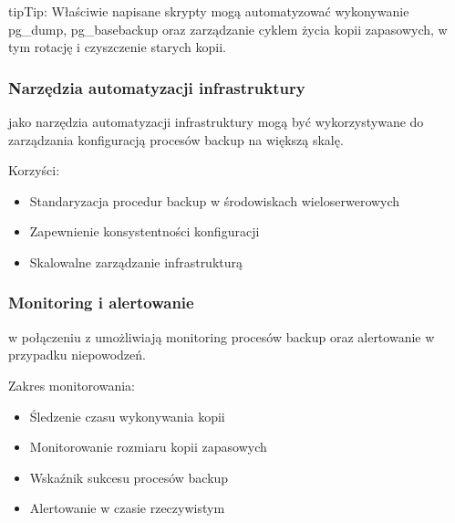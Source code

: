 \documentclass[a4paper,11pt,openany,english]{sphinxmanual}
\begin{document}
\begin{sphinxadmonition}{tip}{Tip:}
\sphinxAtStartPar
Właściwie napisane skrypty mogą automatyzować wykonywanie pg\_dump, pg\_basebackup oraz zarządzanie cyklem życia kopii zapasowych, w tym rotację i czyszczenie starych kopii.
\end{sphinxadmonition}


\subsubsection{Narzędzia automatyzacji infrastruktury}
\label{\detokenize{rozdzial2/Kopie_zapasowe_i_odzyskiwanie_danych/kopie_zapasowe_i_odzyskiwanie_danych:narzedzia-automatyzacji-infrastruktury}}
\sphinxAtStartPar
{} jako narzędzia automatyzacji infrastruktury mogą być wykorzystywane do zarządzania konfiguracją procesów backup na większą skalę.

\sphinxAtStartPar
Korzyści:
\begin{itemize}
\item {} 
\sphinxAtStartPar
Standaryzacja procedur backup w środowiskach wieloserwerowych

\item {} 
\sphinxAtStartPar
Zapewnienie konsystentności konfiguracji

\item {} 
\sphinxAtStartPar
Skalowalne zarządzanie infrastrukturą

\end{itemize}


\subsubsection{Monitoring i alertowanie}
\label{\detokenize{rozdzial2/Kopie_zapasowe_i_odzyskiwanie_danych/kopie_zapasowe_i_odzyskiwanie_danych:monitoring-i-alertowanie}}
\sphinxAtStartPar
{} w połączeniu z  umożliwiają monitoring procesów backup oraz alertowanie w przypadku niepowodzeń.

\sphinxAtStartPar
Zakres monitorowania:
\begin{itemize}
\item {} 
\sphinxAtStartPar
Śledzenie czasu wykonywania kopii

\item {} 
\sphinxAtStartPar
Monitorowanie rozmiaru kopii zapasowych

\item {} 
\sphinxAtStartPar
Wskaźnik sukcesu procesów backup

\item {} 
\sphinxAtStartPar
Alertowanie w czasie rzeczywistym

\end{itemize}
\end{document}
